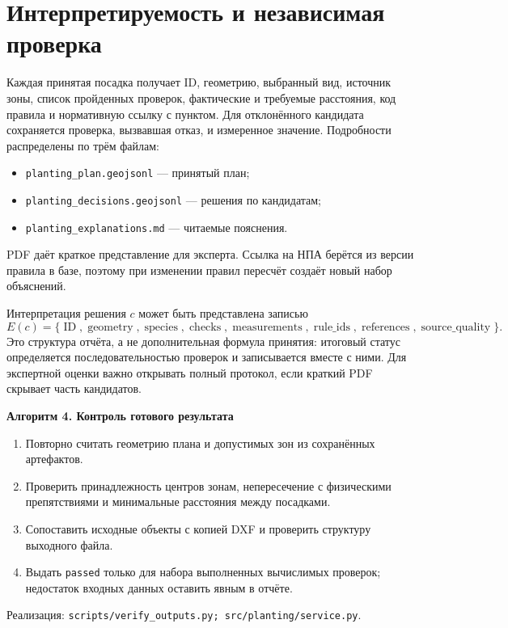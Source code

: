 \documentclass[11pt,a4paper]{article}
\newcommand{\code}[1]{\texttt{#1}}
\newcommand{\src}[1]{\par{\small\color{muted}Реализация: \texttt{#1}.}\par}
\newcommand{\alg}[1]{\medskip\noindent\colorbox{pale}{\parbox{\dimexpr\linewidth-2\fboxsep}{\textbf{#1}}}\smallskip}
\begin{document}
\section{Интерпретируемость и независимая проверка}
Каждая принятая посадка получает ID, геометрию, выбранный вид, источник зоны, список пройденных проверок, фактические и требуемые расстояния, код правила и нормативную ссылку с пунктом. Для отклонённого кандидата сохраняется проверка, вызвавшая отказ, и измеренное значение. Подробности распределены по трём файлам:
\begin{itemize}
\item \code{planting\_plan.geojsonl} --- принятый план;
\item \code{planting\_decisions.geojsonl} --- решения по кандидатам;
\item \code{planting\_explanations.md} --- читаемые пояснения.
\end{itemize}
PDF даёт краткое представление для эксперта. Ссылка на НПА берётся из версии правила в базе, поэтому при изменении правил пересчёт создаёт новый набор объяснений.

Интерпретация решения $c$ может быть представлена записью
\begin{equation}
E(c)=\{\operatorname{ID},\operatorname{geometry},\operatorname{species},
\operatorname{checks},\operatorname{measurements},\operatorname{rule\_ids},
\operatorname{references},\operatorname{source\_quality}\}.
\end{equation}
Это структура отчёта, а не дополнительная формула принятия: итоговый статус определяется последовательностью проверок и записывается вместе с ними. Для экспертной оценки важно открывать полный протокол, если краткий PDF скрывает часть кандидатов.

\alg{Алгоритм 4. Контроль готового результата}
\begin{enumerate}
\item Повторно считать геометрию плана и допустимых зон из сохранённых артефактов.
\item Проверить принадлежность центров зонам, непересечение с физическими препятствиями и минимальные расстояния между посадками.
\item Сопоставить исходные объекты с копией DXF и проверить структуру выходного файла.
\item Выдать \code{passed} только для набора выполненных вычислимых проверок; недостаток входных данных оставить явным в отчёте.
\end{enumerate}
\src{scripts/verify\_outputs.py; src/planting/service.py}
\end{document}
